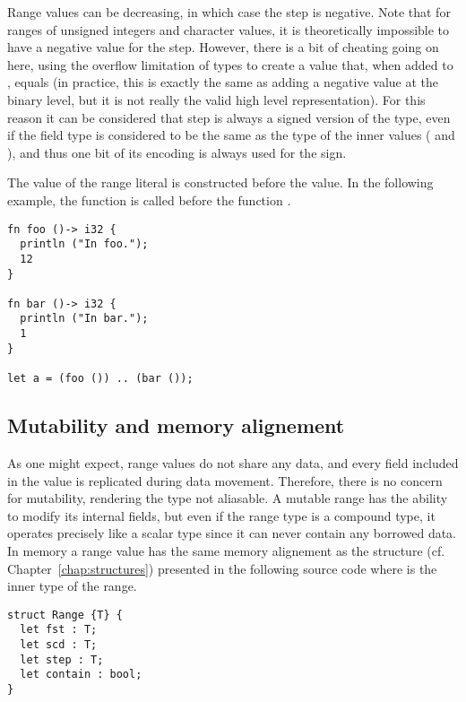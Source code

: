Range values can be decreasing, in which case the step is negative. Note that
for ranges of unsigned integers and character values, it is theoretically
impossible to have a negative value for the step. However, there is a bit of
cheating going on here, using the overflow limitation of types to create a value
that, when added to , equals  (in practice,
this is exactly the same as adding a negative value at the binary level, but it
is not really the valid high level representation). For this reason it can be
considered that step is always a signed version of the type, even if the field
type is considered to be the same as the type of the inner values (
and ), and thus one bit of its encoding is always used for the sign.
\smallskip

The  value of the range literal is constructed before the
 value. In the following example, the function  is
called before the function .

\begin{lstlisting}[style=coloredverbatim]
fn foo ()-> i32 {
  println ("In foo.");
  12
}

fn bar ()-> i32 {
  println ("In bar.");
  1
}

let a = (foo ()) .. (bar ());
\end{lstlisting}

\subsection {Mutability and memory alignement}

As one might expect, range values do not share any data, and every field
included in the value is replicated during data movement. Therefore, there is no
concern for mutability, rendering the type not aliasable. A mutable range has
the ability to modify its internal fields, but even if the range type is a
compound type, it operates precisely like a scalar type since it can never
contain any borrowed data. In memory a range value has the same memory
alignement as the structure (cf. Chapter~\ref{chap:structures}) presented in the
following source code where  is the inner type of the range.

\begin{lstlisting}[style=coloredverbatim]
struct Range {T} {
  let fst : T;
  let scd : T;
  let step : T;
  let contain : bool;
}
\end{lstlisting}

